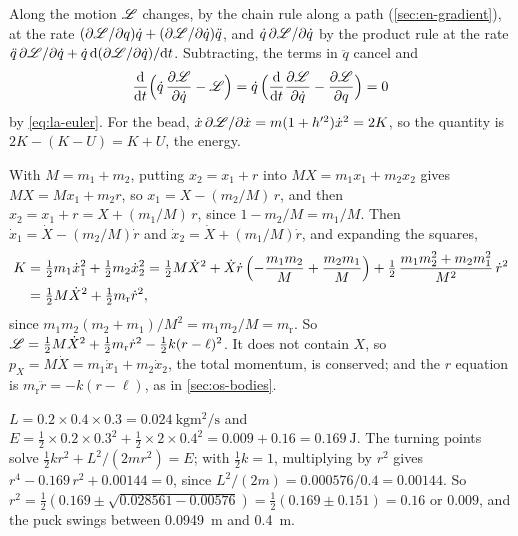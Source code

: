 Along the motion $\mathscr{L}$ changes, by the chain
rule along a path (\cref{sec:en-gradient}), at the rate $(\partial\mathscr{L}/\partial q)\dot{q} + (\partial\mathscr{L}/
\partial\dot{q})\ddot{q}$, and $\dot{q}\,\partial\mathscr{L}/\partial\dot{q}$ by
the product rule at the rate $\ddot{q}\,\partial\mathscr{L}/\partial\dot{q} +
\dot{q}\,\mathrm{d}(\partial\mathscr{L}/\partial\dot{q})/\mathrm{d} t$. Subtracting, the terms
in $\ddot{q}$ cancel and
\begin{equation*}
   \frac{\mathrm{d}}{\mathrm{d} t}\Bigl(\dot{q}\,\frac{\partial\mathscr{L}}{\partial\dot{q}}
   - \mathscr{L}\Bigr) = \dot{q}\,\Bigl(\frac{\mathrm{d}}{\mathrm{d} t}\frac{\partial\mathscr{L}}
   {\partial\dot{q}} - \frac{\partial\mathscr{L}}{\partial q}\Bigr) = 0
\end{equation*}
by \cref{eq:la-euler}. For the bead, $\dot{x}\,\partial\mathscr{L}/\partial
\dot{x} = m(1 + h'^2)\dot{x}^2 = 2K$, so the quantity is $2K - (K - U) = K
+ U$, the energy.

With $M = m_1 + m_2$, putting $x_2 = x_1 + r$ into
$MX = m_1x_1 + m_2x_2$ gives $MX = Mx_1 + m_2r$, so $x_1 = X -
(m_2/M)\,r$, and then $x_2 = x_1 + r = X + (m_1/M)\,r$, since $1 - m_2/M =
m_1/M$. Then $\dot{x}_1 = \dot{X} - (m_2/M)\dot{r}$ and $\dot{x}_2 =
\dot{X} + (m_1/M)\dot{r}$, and expanding the squares,
\begin{align*}
   K &= \tfrac12 m_1\dot{x}_1^2 + \tfrac12 m_2\dot{x}_2^2
   = \tfrac12 M\dot{X}^2 + \dot{X}\dot{r}\,\Bigl(-\frac{m_1m_2}{M}
     + \frac{m_2m_1}{M}\Bigr)
     + \tfrac12\,\frac{m_1m_2^2 + m_2m_1^2}{M^2}\,\dot{r}^2\\
   &= \tfrac12 M\dot{X}^2 + \tfrac12 m_{\mathrm r}\dot{r}^2 ,
\end{align*}
since $m_1m_2(m_2 + m_1)/M^2 = m_1m_2/M = m_{\mathrm r}$. So $\mathscr{L} =
\frac12 M\dot{X}^2 + \frac12 m_{\mathrm r}\dot{r}^2 - \frac12 k(r -
\ell)^2$. It does not contain $X$, so $p_X = M\dot{X} = m_1\dot{x}_1 + m_2\dot{x}_2$, the total momentum,
is conserved; and the $r$ equation is $m_{\mathrm r}\ddot{r} = -k(r -
\ell)$, as in \cref{sec:os-bodies}.

$L = 0.2\times0.4\times0.3 =
\SI{0.024}{\kilogram\metre\squared\per\second}$ and $E = \frac12\times
0.2\times0.3^2 + \frac12\times2\times0.4^2 = 0.009 + 0.16 =
\SI{0.169}{\joule}$. The turning points solve $\frac12 kr^2 + L^2/(2mr^2)
= E$; with $\frac12 k = 1$, multiplying by $r^2$ gives $r^4 - 0.169\,r^2 +
0.00144 = 0$, since $L^2/(2m) = 0.000576/0.4 = 0.00144$. So $r^2 =
\frac12(0.169 \pm\sqrt{0.028561 - 0.00576}) = \frac12(0.169 \pm 0.151) =
0.16$ or $0.009$, and the puck swings between \SI{0.0949}{\metre} and
\SI{0.4}{\metre}.

